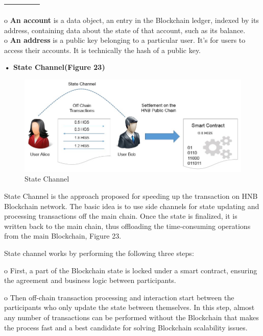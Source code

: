 \documentclass[fleqn,10pt]{SelfArx} %
\begin{document}
\begin{table}[hbt]
\begin{tabular}{lp{4cm}p{8cm}p{14cm}r}
\begin{itemize}
\end{itemize}
\\
\bottomrule
\end{tabular}
\label{tab:label}
\begin{flushleft}
o	\textbf{An account} is a data object, an entry in the Blockchain ledger, indexed by its address, containing data about the state of that account, such as its balance.\\
o	\textbf{An address} is a public key belonging to a particular user. It’s for users to access their accounts. It is technically the hash of a public key. \\
\end{flushleft}
\end{table}


\textbf {•	State Channel(Figure 23)}

\begin{figure}[ht]\centering %
\includegraphics[width=\linewidth]{24}
\caption{State Channel}
\label{fig:24}
\end{figure}

State Channel is the approach proposed for speeding up the transaction on HNB Blockchain network. The basic idea is to use side channels for state updating and processing transactions off the main chain. Once the state is finalized, it is written back to the main chain, thus offloading the time-consuming operations from the main Blockchain, Figure 23. 

State channel works by performing the following three steps:

o	First, a part of the Blockchain state is locked under a smart contract, ensuring the agreement and business logic between participants. 

o	Then off-chain transaction processing and interaction start between the participants who only update the state between themselves. In this step, almost any number of transactions can be performed without the Blockchain that makes the process fast and a best candidate for solving Blockchain scalability issues. 
\end{document}
